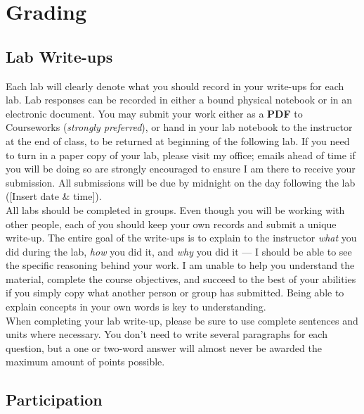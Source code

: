 \documentclass[11pt]{article}
\begin{document}
\section*{Grading}

\subsection*{Lab Write-ups}

Each lab will clearly denote what you should record in your write-ups for each lab. Lab responses can be recorded in either a bound physical notebook or in an electronic document. You may submit your work either as a \textbf{PDF} to Courseworks (\textit{strongly preferred}), or hand in your lab notebook to the instructor at the end of class, to be returned at beginning of the following lab. If you need to turn in a paper copy of your lab, please visit my office; emails ahead of time if you will be doing so are strongly encouraged to ensure I am there to receive your submission. All submissions will be due by midnight on the day following the lab ([Insert date \& time]). \\

All labs should be completed in groups. Even though you will be working with other people, each of you should keep your own records and submit a unique write-up. The entire goal of the write-ups is to explain to the instructor \textit{what} you did during the lab, \textit{how} you did it, and \textit{why} you did it --- I should be able to see the specific reasoning behind your work. I am unable to help you understand the material, complete the course objectives, and succeed to the best of your abilities if you simply copy what another person or group has submitted. Being able to explain concepts in your own words is key to understanding. \\

When completing your lab write-up, please be sure to use complete sentences and units where necessary. You don't need to write several paragraphs for each question, but a one or two-word answer will almost never be awarded the maximum amount of points possible. \\



\subsection*{Participation}
\end{document}
